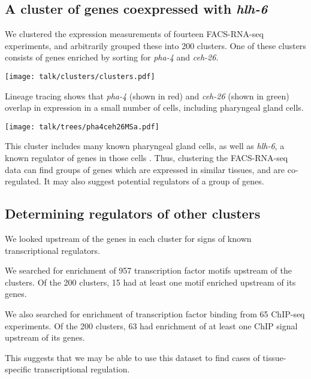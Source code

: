 \documentclass[landscape,a0]{a0poster}
\begin{document}
\begin{multicols}{4}
\columnbreak

\subsection*{A cluster of genes coexpressed with {\em hlh-6}}

We clustered the expression measurements of fourteen FACS-RNA-seq experiments,
and arbitrarily grouped these into 200 clusters. One of these clusters consists of genes
enriched by sorting for {\em pha-4} and {\em ceh-26}.

\begin{center}
\texttt{[image: talk/clusters/clusters.pdf]}
\end{center}

\vspace{1in}

Lineage tracing shows that {\em pha-4} (shown in red) and {\em ceh-26}
(shown in green) overlap
in expression in a small number of cells, including pharyngeal gland cells.

\begin{center}
\texttt{[image: talk/trees/pha4ceh26MSa.pdf]}
\end{center}

This cluster includes many known pharyngeal gland cells, as well as
{\em hlh-6}, a known regulator of genes in those cells
\cite{smit_hlh-6_2008}. Thus, clustering the FACS-RNA-seq data can find groups
of genes which are expressed in similar tissues, and are co-regulated. It may
also suggest potential regulators of a group of genes.

\subsection*{Determining regulators of other clusters}

We looked upstream of the genes in each cluster for signs of known transcriptional
regulators.

We searched for enrichment of 957 transcription factor motifs upstream of the clusters.
Of the 200 clusters, 15 had at least one motif enriched upstream of its genes.

We also searched for enrichment of transcription factor binding from
65 ChIP-seq experiments. Of the 200 clusters, 63 had enrichment of at least
one ChIP signal upstream of its genes.

This suggests that we may be able to use this dataset to find cases of
tissue-specific transcriptional regulation.


\end{multicols}
\end{document}
